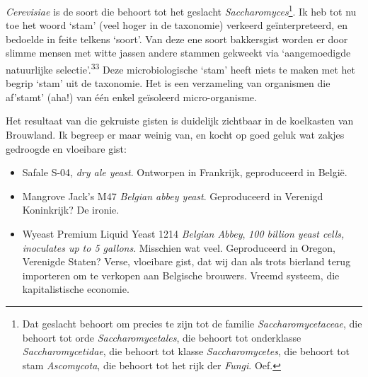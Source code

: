 \documentclass[
  11pt,
  dutch,
]{memoir}
\providecommand{\tightlist}{%
  \setlength{\itemsep}{0pt}\setlength{\parskip}{0pt}}
\begin{document}
\emph{Cerevisiae} is de soort die behoort tot het geslacht
\emph{Saccharomyces}\footnote{Dat geslacht behoort om precies te zijn
  tot de familie \emph{Saccharomycetaceae}, die behoort tot orde
  \emph{Saccharomycetales}, die behoort tot onderklasse
  \emph{Saccharomycetidae}, die behoort tot klasse
  \emph{Saccharomycetes}, die behoort tot stam \emph{Ascomycota}, die
  behoort tot het rijk der \emph{Fungi}. Oef.}. Ik heb tot nu toe het
woord `stam' (veel hoger in de taxonomie) verkeerd geïnterpreteerd, en
bedoelde in feite telkens `soort'. Van deze ene soort bakkersgist worden
er door slimme mensen met witte jassen andere stammen gekweekt via
`aangemoedigde natuurlijke selectie'.\textsuperscript{33} Deze
microbiologische `stam' heeft niets te maken met het begrip `stam' uit
de taxonomie. Het is een verzameling van organismen die af'stamt' (aha!)
van één enkel geïsoleerd micro-organisme.

Het resultaat van die gekruiste gisten is duidelijk zichtbaar in de
koelkasten van Brouwland. Ik begreep er maar weinig van, en kocht op
goed geluk wat zakjes gedroogde en vloeibare gist:

\begin{itemize}
\tightlist
\item
  Safale S-04, \emph{dry ale yeast}. Ontworpen in Frankrijk,
  geproduceerd in België.
\item
  Mangrove Jack's M47 \emph{Belgian abbey yeast}. Geproduceerd in
  Verenigd Koninkrijk? De ironie.\\
\item
  Wyeast Premium Liquid Yeast 1214 \emph{Belgian Abbey}, \emph{100
  billion yeast cells, inoculates up to 5 gallons}. Misschien wat veel.
  Geproduceerd in Oregon, Verenigde Staten? Verse, vloeibare gist, dat
  wij dan als trots bierland terug importeren om te verkopen aan
  Belgische brouwers. Vreemd systeem, die kapitalistische economie.
\end{itemize}
\end{document}
